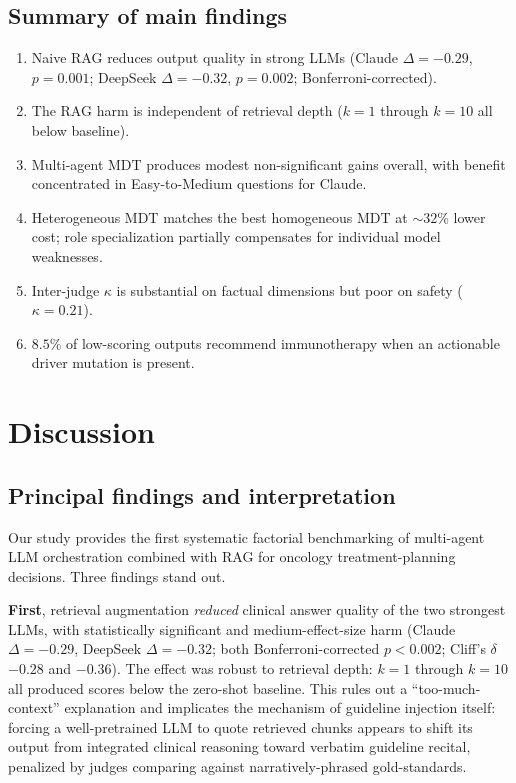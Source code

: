 \documentclass[final, 11pt, 3p]{elsarticle}
\begin{document}
\subsection{Summary of main findings}
\begin{enumerate}
\item Naive RAG reduces output quality in strong LLMs (Claude
  $\Delta{=}-0.29$, $p{=}0.001$; DeepSeek $\Delta{=}-0.32$,
  $p{=}0.002$; Bonferroni-corrected).
\item The RAG harm is independent of retrieval depth ($k{=}1$ through
  $k{=}10$ all below baseline).
\item Multi-agent MDT produces modest non-significant gains overall,
  with benefit concentrated in Easy-to-Medium questions for Claude.
\item Heterogeneous MDT matches the best homogeneous MDT at $\sim 32\%$
  lower cost; role specialization partially compensates for individual
  model weaknesses.
\item Inter-judge $\kappa$ is substantial on factual dimensions but
  poor on safety ($\kappa{=}0.21$).
\item $8.5\%$ of low-scoring outputs recommend immunotherapy when an
  actionable driver mutation is present.
\end{enumerate}

\section{Discussion}
\label{sec:discussion}

\subsection{Principal findings and interpretation}
Our study provides the first systematic factorial benchmarking of
multi-agent LLM orchestration combined with RAG for oncology
treatment-planning decisions. Three findings stand out.

\textbf{First}, retrieval augmentation \emph{reduced} clinical answer
quality of the two strongest LLMs, with statistically significant and
medium-effect-size harm (Claude $\Delta{=}-0.29$, DeepSeek
$\Delta{=}-0.32$; both Bonferroni-corrected $p<0.002$; Cliff's $\delta$
$-0.28$ and $-0.36$). The effect was robust to retrieval depth: $k{=}1$
through $k{=}10$ all produced scores below the zero-shot baseline.
This rules out a ``too-much-context'' explanation and implicates the
mechanism of guideline injection itself: forcing a well-pretrained LLM
to quote retrieved chunks appears to shift its output from integrated
clinical reasoning toward verbatim guideline recital, penalized by
judges comparing against narratively-phrased gold-standards.
\end{document}
